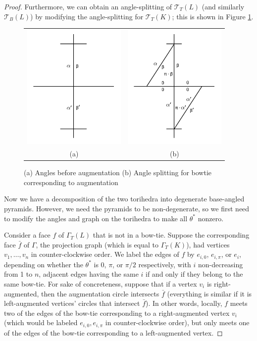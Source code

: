 \documentclass[11pt]{amsart}
\newcommand{\sT}{{\mathcal{T}}}
\theoremstyle{plain}
\theoremstyle{definition}
\begin{document}
\begin{proof}
Furthermore, we can obtain an angle-splitting of $\sT_T(L)$
(and similarly $\sT_B(L)$) by modifying the angle-splitting
for $\sT_T(K)$;
this is shown in Figure \ref{f:bowtie_angles2}. 


\begin{figure}
\begin{tabular}{cc}
\includegraphics[width = 5cm]{before_bowtie_angles.png}&
\includegraphics[width = 5cm]{bowtie_angles.png}\\
(a)&(b)
\end{tabular}
\caption{(a) Angles before augmentation (b) Angle splitting for bowtie corresponding to augmentation}
\label{f:bowtie_angles2}
\end{figure}

Now we have a decomposition of the two torihedra into
degenerate base-angled pyramids.
However, we need the pyramids to be non-degenerate,
so we first need to modify the angles and graph on the torihedra
to make all $\theta^*$ nonzero.


Consider a face $f$ of $\Gamma_T(L)$ that is not in a bow-tie.
Suppose the corresponding face $\bar{f}$ of $\Gamma$,
the projection graph (which is equal to $\Gamma_T(K)$),
had vertices $v_1,\ldots,v_n$ in counter-clockwise order.
We label the edges of $f$ by $e_{i,0}$, $e_{i,\pi}$, or $e_i$,
depending on whether the $\theta^*$ is $0$, $\pi$, or $\pi/2$ respectively,
with $i$ non-decreasing from 1 to $n$,
adjacent edges having the same $i$ if and only if they
belong to the same bow-tie.
For sake of concreteness,
suppose that if a vertex $v_i$ is right-augmented,
then the augmentation circle intersects $\bar{f}$
(everything is similar if it is left-augmented vertices' circles
that intersect $\bar{f}$).
In other words, locally, $f$ meets two of the edges of the bow-tie
corresponding to a right-augmented vertex $v_i$
(which would be labeled $e_{i,0}, e_{i,\pi}$ in counter-clockwise order),
but only meets one of the edges of the bow-tie corresponding to
a left-augmented vertex.



\end{proof}
\end{document}
